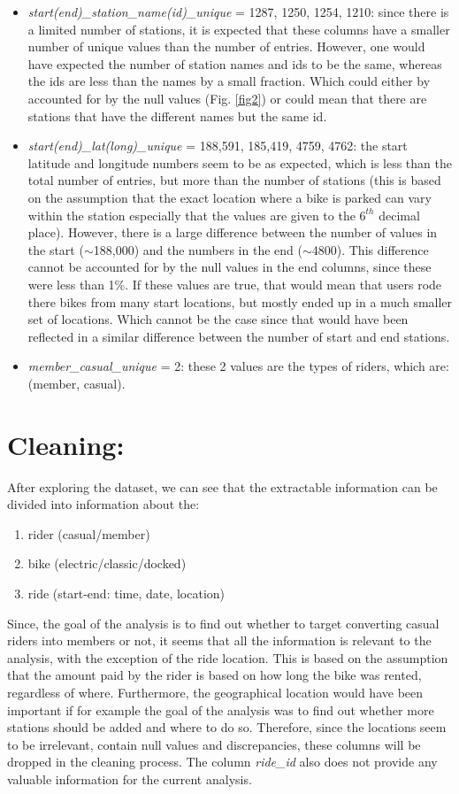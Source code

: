 \documentclass[12pt]{article}
\begin{document}
\begin{itemize}
	\item \textit{start(end)\_station\_name(id)\_unique} = 1287, 1250, 1254, 1210: since there is a limited number of stations, it is expected that these columns have a smaller number of unique values than the number of entries. However, one would have expected the number of station names and ids to be the same, whereas the ids are less than the names by a small fraction. Which could either by accounted for by the null values (Fig. \ref{fig2}) or could mean that there are stations that have the different names but the same id.
	\item \textit{start(end)\_lat(long)\_unique} = 188,591, 185,419, 4759, 4762: the start latitude and longitude numbers seem to be as expected, which is less than the total number of entries, but more than the number of stations (this is based on the assumption that the exact location where a bike is parked can vary within the station especially that the values are given to the $6^{th}$ decimal place). However, there is a large difference between the number of values in the start ($\sim$188,000) and the numbers in the end ($\sim$4800). This difference cannot be accounted for by the null values in the end columns, since these were less than 1\%. If these values are true, that would mean that users rode there bikes from many start locations, but mostly ended up in a much smaller set of locations. Which cannot be the case since that would have been reflected in a similar difference between the number of start and end stations. 
	\item \textit{member\_casual\_unique} = 2: these 2 values are the types of riders, which are: \Big(member, casual\Big).
	\end{itemize}

	
\section*{Cleaning:}
After exploring the dataset, we can see that the extractable information can be divided into information about the:
	\begin{enumerate} 
	\item rider (casual/member)
	\item bike (electric/classic/docked)
	\item ride (start-end: time, date, location)
	\end{enumerate}
	
Since, the goal of the analysis is to find out whether to target converting casual riders into members or not, it seems that all the information is relevant to the analysis, with the exception of the ride location. This is based on the assumption that the amount paid by the rider is based on how long the bike was rented, regardless of where. Furthermore, the geographical location would have been important if for example the goal of the analysis was to find out whether more stations should be added and where to do so. Therefore, since the locations seem to be irrelevant, contain null values and discrepancies, these columns will be dropped in the cleaning process. The column \textit{ride\_id} also does not provide any valuable information for the current analysis. \\
\end{document}
